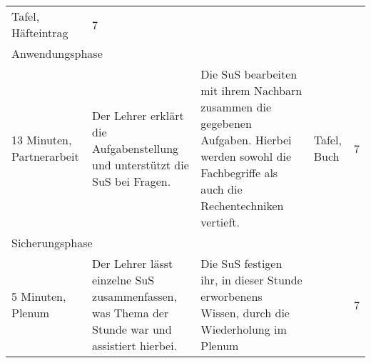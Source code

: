 \begin{tabularx}{\textwidth}{|X|X|X|X|X|}
Tafel, Häfteintrag & 7\\
\multicolumn{5}{|l|}{Anwendungsphase}\\
\hline
13 Minuten, Partnerarbeit &
Der Lehrer erklärt die Aufgabenstellung und unterstützt die SuS bei Fragen.&
Die SuS bearbeiten mit ihrem Nachbarn zusammen die gegebenen Aufgaben. Hierbei werden sowohl die Fachbegriffe  als auch die Rechentechniken vertieft.&
Tafel, Buch & 7\\
\multicolumn{5}{|l|}{Sicherungsphase}\\
\hline
5 Minuten, Plenum &
Der Lehrer lässt einzelne SuS zusammenfassen, was Thema der Stunde war und assistiert hierbei.&
Die SuS festigen ihr, in dieser Stunde erworbenens Wissen, durch die Wiederholung im Plenum &
 & 7\\
\end{tabularx}

